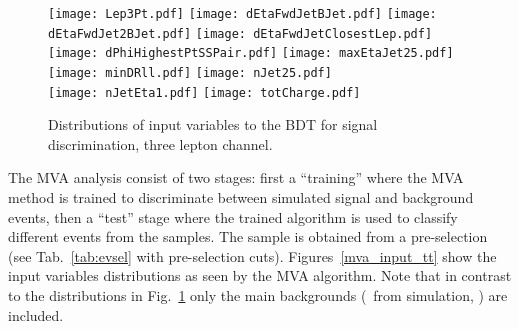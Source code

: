 \begin{figure} [!h]
 \centering
 \texttt{[image: Lep3Pt.pdf]} 
 \texttt{[image: dEtaFwdJetBJet.pdf]}
 \texttt{[image: dEtaFwdJet2BJet.pdf]}
 \texttt{[image: dEtaFwdJetClosestLep.pdf]} \\
 \texttt{[image: dPhiHighestPtSSPair.pdf]}
 \texttt{[image: maxEtaJet25.pdf]}
 \texttt{[image: minDRll.pdf]}
 \texttt{[image: nJet25.pdf]} \\
 \texttt{[image: nJetEta1.pdf]}
 \texttt{[image: totCharge.pdf]}
\caption[Input variables to the BDT for signal discrimination not normalized.]{Distributions of input variables to the BDT for signal discrimination, three lepton channel.} 
\label{fig:input_vars_3l}
\end{figure}    


The MVA analysis consist of two stages: first a ``training'' where the MVA method is trained to discriminate between simulated signal and background events, then a ``test'' stage where the trained algorithm is used to classify different events from the samples. The sample is obtained from a pre-selection (see Tab.~\ref{tab:evsel} with pre-selection cuts). Figures~\ref{mva_input_tt} show the input variables distributions as seen by the MVA algorithm. Note that in contrast to the distributions in Fig.~\ref{fig:input_vars_3l} only the main backgrounds (\ttbar\ from simulation, \ttV) are included.

